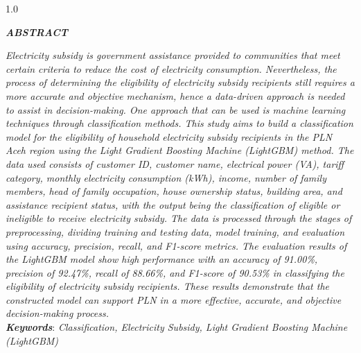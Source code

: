 \documentclass[12pt, a4paper, onecolumn, oneside]{report}
\begin{document}
\newpage
{}
{}
\begin{spacing}{1.0}
\begin{center}
    \textbf{\textit{ABSTRACT}}\\[0.5cm]
\end{center}

\noindent \textit{Electricity subsidy is government assistance provided to communities that meet certain criteria to reduce the cost of electricity consumption. Nevertheless, the process of determining the eligibility of electricity subsidy recipients still requires a more accurate and objective mechanism, hence a data-driven approach is needed to assist in decision-making. One approach that can be used is machine learning techniques through classification methods. This study aims to build a classification model for the eligibility of household electricity subsidy recipients in the PLN Aceh region using the Light Gradient Boosting Machine (LightGBM) method. The data used consists of customer ID, customer name, electrical power (VA), tariff category, monthly electricity consumption (kWh), income, number of family members, head of family occupation, house ownership status, building area, and assistance recipient status, with the output being the classification of eligible or ineligible to receive electricity subsidy. The data is processed through the stages of preprocessing, dividing training and testing data, model training, and evaluation using accuracy, precision, recall, and F1-score metrics. The evaluation results of the LightGBM model show high performance with an accuracy of 91.00\%, precision of 92.47\%, recall of 88.66\%, and F1-score of 90.53\% in classifying the eligibility of electricity subsidy recipients. These results demonstrate that the constructed model can support PLN in a more effective, accurate, and objective decision-making process.}\\[0.6cm]

\noindent \textbf{\textit{Keywords}}: \textit{Classification, Electricity Subsidy, Light Gradient Boosting Machine (LightGBM)}
\end{spacing}

\newpage

\renewcommand{\contentsname}{}
\renewcommand{\listfigurename}{}
\renewcommand{\listtablename}{}
\end{document}
